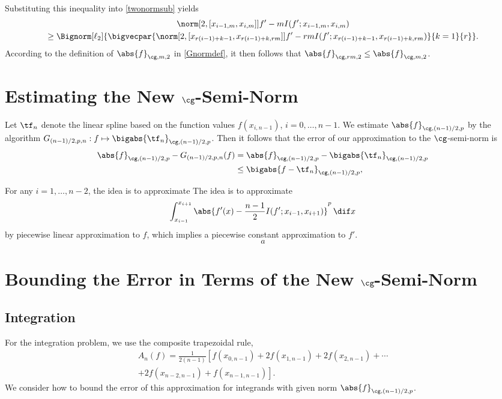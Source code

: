 \documentclass[final]{elsarticle}
\newcommand{\Gnorm}[3]{\abs{#3}_{\cg,#2,#1}}
\theoremstyle{definition}
\theoremstyle{remark}
\begin{document}
Substituting this inequality into \eqref{twonormsub} yields 
\begin{multline*}
\norm[2,{[x_{i-1,m},x_{i,m}]}]{f' - m I(f';x_{i-1,m},x_{i,m})} \\
\ge \Bignorm[\ell_2]{\bigvecpar{\norm[2,{[x_{r(i-1)+k-1},x_{r(i-1)+k,rm}]}]{f' - rm I(f';x_{r(i-1)+k-1},x_{r(i-1)+k,rm})}}{k=1}{r}}.
\end{multline*}
According to the definition of $\Gnorm{2}{m}{f}$ in \eqref{Gnormdef}, it then follows that $\Gnorm{2}{rm}{f} \le \Gnorm{2}{m}{f}$.

\section{Estimating the New $\cg$-Semi-Norm}

Let $\tf_n$ denote the linear spline based on the function values $f(x_{i,n-1})$, $i=0, \ldots, n-1$. We  estimate $\Gnorm{p}{(n-1)/2}{f}$ by the algorithm $G_{(n-1)/2,p,n}:f \mapsto \bigabs{\tf_n}_{\cg,(n-1)/2,p}$.  Then it follows that the error of our approximation to the $\cg$-semi-norm is 
\begin{align*}
\Gnorm{p}{(n-1)/2}{f} - G_{(n-1)/2,p,n}(f) &= \Gnorm{p}{(n-1)/2}{f} - \bigabs{\tf_n}_{\cg,(n-1)/2,p} \\
&\le \bigabs{f-\tf_n}_{\cg,(n-1)/2,p},
\end{align*}


For any $i=1, \ldots, n-2$, the idea is to approximate  The idea is to approximate
\[
\int_{x_{i-1}}^{x_{i+1}} \abs{f'(x)-\frac{n-1}{2}I(f';x_{i-1},x_{i+1})}^p \, \dif x 
\]
by piecewise linear approximation to $f$, which implies a piecewise constant approximation to $f'$.  
\[
a
\] 

\section{Bounding the Error in Terms of the New $\cg$-Semi-Norm}
\subsection{Integration}

For the integration problem, we use the composite trapezoidal rule, 
\begin{multline*}
A_n(f) = \frac{1}{2(n-1)} \left[f(x_{0,n-1}) + 2f(x_{1,n-1}) + 2f(x_{2,n-1}) + \cdots \right.\\
\left . + 2f(x_{n-2,n-1}) + f(x_{n-1,n-1})\right].
\end{multline*}
We consider how to bound the error of this approximation for integrands with given norm $\Gnorm{p}{(n-1)/2}{f}$.
\end{document}
